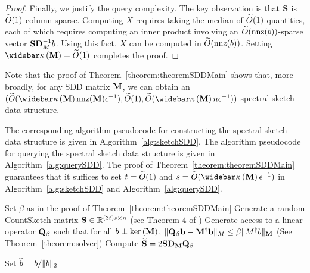 \begin{proof}
Finally, we justify the query complexity. The key observation is that $\mathbf{S}$ is $\widetilde{O}( {1} )$-column sparse. Computing $X$ requires taking the median of $\widetilde{O}( {1} )$ quantities, each of which requires computing an inner product involving an $\widetilde{O}( {\mathrm{nnz}(b)} )$-sparse vector $\mathbf{S} {\mathbf{D}}_{M}^{-1} b$. Using this fact, $X$ can be computed in $\widetilde{O}( {\mathrm{nnz}(b)} ) $. Setting $\pcondOf{\M} = \Otilde{1}$ completes the proof.
\end{proof}

\begin{remark} Note that the proof of Theorem~\ref{theorem:theoremSDDMain} shows that, more broadly, for any SDD matrix $\mathbf{M}$, we can obtain an $(\Otilde{\pcondOf{\M} \nnz(\M) \epsilon^{-1}}, \Otilde{1}, \Otilde{\pcondOf{\M} n \epsilon^{-1}})$ spectral sketch data structure. 
\end{remark}

The corresponding algorithm pseudocode for constructing the spectral sketch data structure is given in Algorithm~\ref{alg:sketchSDD}. The algorithm pseudocode for querying the spectral sketch data structure is given in Algorithm~\ref{alg:querySDD}. The proof of Theorem~\ref{theorem:theoremSDDMain} guarantees that it suffices to set $t = \widetilde{O}( {1} )$ and $s = \Otilde{\pcondOf{\M}\epsilon^{-1}}$ in Algorithm~\ref{alg:sketchSDD} and Algorithm~\ref{alg:querySDD}.

\begin{algorithm}[ht]
    \SetAlgoLined
    Set $\beta$ as in the proof of Theorem~\ref{theorem:theoremSDDMain}\; 
    Generate a random CountSketch matrix $\mathbf{S} \in \mathbb{R}^{(3t)s \times n}$ (see Theorem 4 of \cite{LPT2012})  
    \; 
    Generate access to a linear operator $\mathbf{Q}_\beta$ such that for all $b \perp \mathrm{ker}\left(\mathbf{M}\right)$,  $\Vert \mathbf{Q}_\beta {\bf b} - \mathbf{M}^\dagger {\bf b} \Vert_M \leq \beta \|M^\dagger b\|_{\mathbf{M}}$ (See Theorem~\ref{theorem:solver})\; 
    Compute $\widetilde{\mathbf{S}} = 2\mathbf{S} {\mathbf{D}}_{\mathbf{M}}\mathbf{Q}_\beta$\; 
    \Return{$(\Smat, \widetilde{\Smat})$}
    \caption{SpectralSketchSDDInverse}
    \label{alg:sketchSDD}
\end{algorithm}

\begin{algorithm}[ht]
    \SetAlgoLined
    Set $\widetilde{b} = b/\|b\|_2$\;
    \caption{QuerySketchSDDInverse}
    \label{alg:querySDD}
\end{algorithm}


